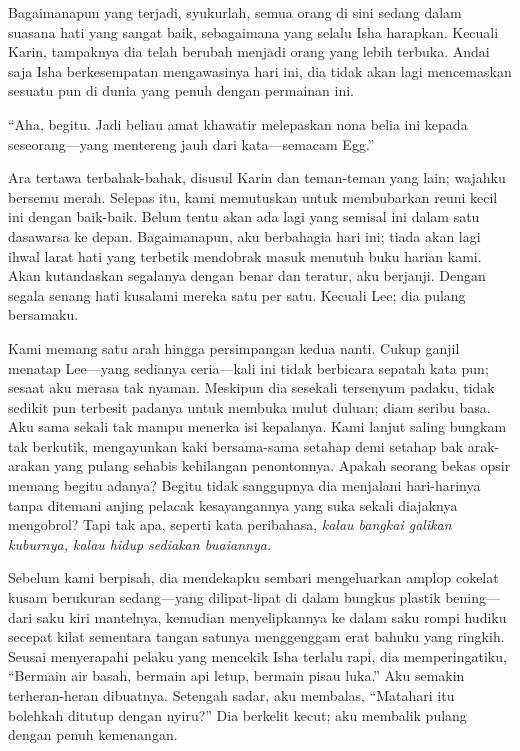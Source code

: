 \documentclass[smalldemyvopaper,11pt,twoside,onecolumn,openright,extrafontsizes]{memoir}
\begin{document}
Bagaimanapun yang terjadi, syukurlah, semua orang di sini sedang dalam suasana hati yang sangat baik, sebagaimana yang selalu Isha harapkan. Kecuali Karin, tampaknya dia telah berubah menjadi orang yang lebih terbuka. Andai saja Isha berkesempatan mengawasinya hari ini, dia tidak akan lagi mencemaskan sesuatu pun di dunia yang penuh dengan permainan ini.

``Aha, begitu. Jadi beliau amat khawatir melepaskan nona belia ini kepada seseorang---yang mentereng jauh dari kata---semacam Egg.''

Ara tertawa terbahak-bahak, disusul Karin dan teman-teman yang lain; wajahku bersemu merah. Selepas itu, kami memutuskan untuk membubarkan reuni kecil ini dengan baik-baik. Belum tentu akan ada lagi yang semisal ini dalam satu dasawarsa ke depan. Bagaimanapun, aku berbahagia hari ini; tiada akan lagi ihwal larat hati yang terbetik mendobrak masuk menutuh buku harian kami. Akan kutandaskan segalanya dengan benar dan teratur, aku berjanji. Dengan segala senang hati kusalami mereka satu per satu. Kecuali Lee; dia pulang bersamaku.


Kami memang satu arah hingga persimpangan kedua nanti. Cukup ganjil menatap Lee---yang sedianya ceria---kali ini tidak berbicara sepatah kata pun; sesaat aku merasa tak nyaman. Meskipun dia sesekali tersenyum padaku, tidak sedikit pun terbesit padanya untuk membuka mulut duluan; diam seribu basa. Aku sama sekali tak mampu menerka isi kepalanya. Kami lanjut saling bungkam tak berkutik, mengayunkan kaki bersama-sama setahap demi setahap bak arak-arakan yang pulang sehabis kehilangan penontonnya. Apakah seorang bekas opsir memang begitu adanya? Begitu tidak sanggupnya dia menjalani hari-harinya tanpa ditemani anjing pelacak kesayangannya yang suka sekali diajaknya mengobrol? Tapi tak apa, seperti kata peribahasa, \textit{kalau bangkai galikan kuburnya, kalau hidup sediakan buaiannya.}

Sebelum kami berpisah, dia mendekapku sembari mengeluarkan amplop cokelat kusam berukuran sedang---yang dilipat-lipat di dalam bungkus plastik bening---dari saku kiri mantelnya, kemudian menyelipkannya ke dalam saku rompi hudiku secepat kilat sementara tangan satunya menggenggam erat bahuku yang ringkih. Seusai menyerapahi pelaku yang mencekik Isha terlalu rapi, dia memperingatiku, ``Bermain air basah, bermain api letup, bermain pisau luka.'' Aku semakin terheran-heran dibuatnya. Setengah sadar, aku membalas, ``Matahari itu bolehkah ditutup dengan nyiru?'' Dia berkelit kecut; aku membalik pulang dengan penuh kemenangan.
\end{document}
